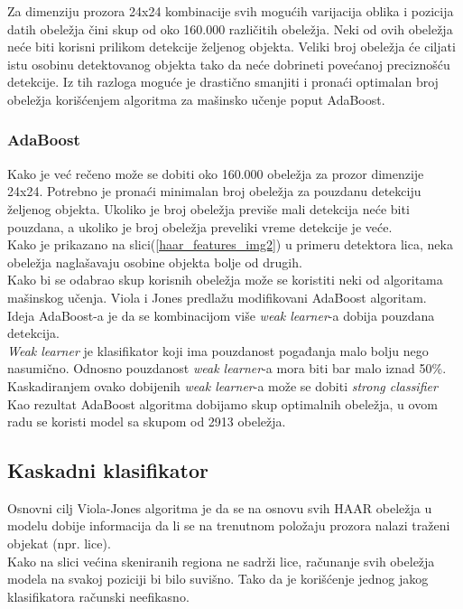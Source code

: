 Za dimenziju prozora 24x24 kombinacije svih mogućih varijacija oblika i pozicija
datih obeležja čini skup od oko 160.000 različitih obeležja.
Neki od ovih obeležja neće biti korisni prilikom detekcije željenog objekta.
Veliki broj obeležja će ciljati istu osobinu detektovanog objekta tako da neće
dobrineti povećanoj preciznošću detekcije.
Iz tih razloga moguće je drastično smanjiti i pronaći optimalan broj obeležja
korišćenjem algoritma za mašinsko učenje poput AdaBoost. \\

\subsubsection{AdaBoost}

Kako je već rečeno može se dobiti oko 160.000 obeležja za prozor dimenzije
24x24.
Potrebno je pronaći minimalan broj obeležja za pouzdanu detekciju željenog objekta.
Ukoliko je broj obeležja previše mali detekcija neće biti pouzdana, a ukoliko je
broj obeležja preveliki vreme detekcije je veće. \\
Kako je prikazano na slici(\ref{haar_features_img2}) u primeru detektora lica,
neka obeležja naglašavaju osobine objekta bolje od drugih. \\

Kako bi se odabrao skup korisnih obeležja može se koristiti neki od algoritama
mašinskog učenja. Viola i Jones predlažu modifikovani AdaBoost algoritam. \\

Ideja AdaBoost-a je da se kombinacijom više \emph{weak learner}-a dobija
pouzdana detekcija. \\
\emph{Weak learner} je klasifikator koji ima pouzdanost pogađanja malo bolju
nego nasumično. Odnosno pouzdanost \emph{weak learner}-a mora biti bar malo
iznad 50\%. \\
Kaskadiranjem ovako dobijenih \emph{weak learner}-a može se dobiti \emph{strong
  classifier} \\
Kao rezultat AdaBoost algoritma dobijamo skup optimalnih obeležja, u ovom radu se koristi
model sa skupom od 2913 obeležja.

\subsection{Kaskadni klasifikator}

Osnovni cilj Viola-Jones algoritma je da se na osnovu svih HAAR obeležja u modelu dobije informacija da li se na
trenutnom položaju prozora nalazi traženi objekat (npr. lice).\\
Kako na slici većina skeniranih regiona ne sadrži lice, računanje svih obeležja modela
na svakoj poziciji bi bilo suvišno.
Tako da je korišćenje jednog jakog klasifikatora računski neefikasno. \\

